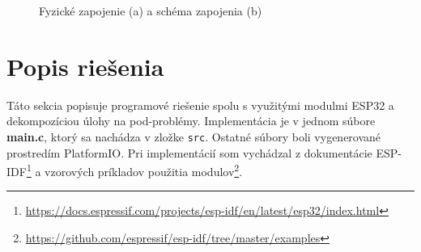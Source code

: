 \documentclass[a4paper]{article}
\begin{document}
\begin{figure}[h]
    \centering
    \hfill
    \caption{Fyzické zapojenie (a) a schéma zapojenia (b)}
    \label{zapojenie}
\end{figure}

\newpage
\section{Popis riešenia}
Táto sekcia popisuje programové riešenie spolu s využitými modulmi ESP32 a dekompozíciou úlohy na pod-problémy. Implementácia je v jednom súbore \textbf{main.c}, ktorý sa nachádza v zložke \texttt{src}. 
Ostatné súbory boli vygenerované prostredím PlatformIO. Pri implementácií som vychádzal z dokumentácie ESP-IDF\footnote{\href{https://docs.espressif.com/projects/esp-idf/en/latest/esp32/index.html}{https://docs.espressif.com/projects/esp-idf/en/latest/esp32/index.html}} a vzorových príkladov použitia modulov\footnote{\href{https://github.com/espressif/esp-idf/tree/master/examples}{https://github.com/espressif/esp-idf/tree/master/examples}}.
\end{document}

